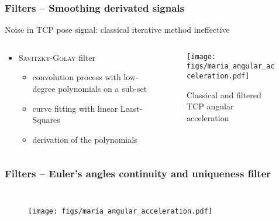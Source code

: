 \documentclass[aspectratio=1610]{beamer}
\begin{document}
\begin{frame}
\frametitle{Filters – Smoothing derivated signals}
Noise in TCP pose signal: classical iterative method ineffective
\begin{columns}
\begin{column}{0.5\textwidth}
  \begin{itemize}\itemsep1em
    \justifying
    \item \textsc{Savitzky-Golay} filter
    \begin{itemize}
      \item convolution process with low-degree polynomials on a sub-set
      \item curve fitting with linear Least-Squares
      \item derivation of the polynomials
    \end{itemize}
  \end{itemize}
\end{column}
\begin{column}{0.5\textwidth}  %
  \begin{figure}
    \centering
    \texttt{[image: figs/maria\_angular\_acceleration.pdf]}
    \caption{Classical and filtered TCP angular acceleration}
  \end{figure}
\end{column}
\end{columns}

\end{frame}

\begin{frame}
\frametitle{Filters – Euler's angles continuity and uniqueness filter}
\begin{columns}
  \column{37em}
  \begin{figure}
    \centering
    \texttt{[image: figs/maria\_angular\_acceleration.pdf]}
  \end{figure}
\end{columns}
\end{frame}
\end{document}
